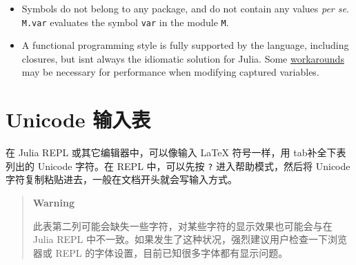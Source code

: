 \begin{itemize}
\item Symbols do not belong to any package, and do not contain any values \emph{per se}. \texttt{M.var} evaluates the symbol \texttt{var} in the module \texttt{M}.


\item A functional programming style is fully supported by the language, including closures, but isn{\textquotesingle}t always the idiomatic solution for Julia. Some \hyperlink{627547588659365489}{workarounds} may be necessary for performance when modifying captured variables.

\end{itemize}


\hypertarget{9161019699686356187}{}


\chapter{Unicode 输入表}



在 Julia REPL 或其它编辑器中，可以像输入 LaTeX 符号一样，用 tab补全下表列出的 Unicode 字符。在 REPL 中，可以先按 \texttt{?} 进入帮助模式，然后将 Unicode 字符复制粘贴进去，一般在文档开头就会写输入方式。



\begin{quote}
\textbf{Warning}

此表第二列可能会缺失一些字符，对某些字符的显示效果也可能会与在 Julia REPL 中不一致。如果发生了这种状况，强烈建议用户检查一下浏览器或 REPL 的字体设置，目前已知很多字体都有显示问题。

\end{quote}





